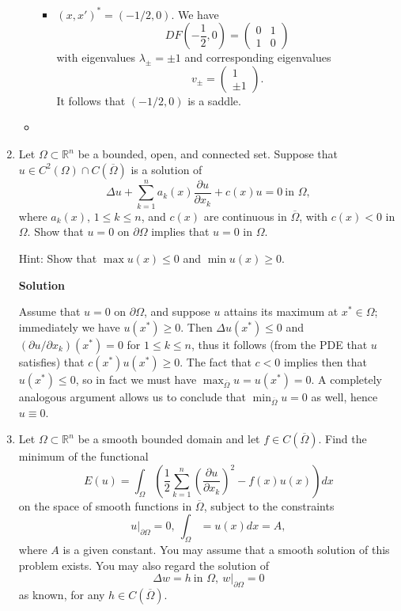 \documentclass{article}
\begin{document}
\begin{enumerate}
\begin{itemize}
\begin{itemize}
\item \((x,x')^* = (-1/2, 0)\).  We have
\[DF \left( -\frac{1}{2}, 0 \right) = \left( \begin{array}{cc} 0 & 1 \\ 1 & 0 \end{array} \right)\]
with eigenvalues \(\lambda_{\pm} = \pm 1\) and corresponding eigenvalues
\[v_{\pm} = \left( \begin{array}{c} 1 \\ \pm 1 \end{array} \right).\]
It follows that \((-1/2, 0)\) is a saddle.

\end{itemize}

\item

\end{itemize}



\item Let \(\Omega \subset \mathbb{R}^n\) be a bounded, open, and connected set.  Suppose that \(u \in C^2(\Omega) \cap C \left( \overline{\Omega} \right)\) is a solution of
\[\Delta u + \sum_{k = 1}^n a_k(x) \frac{\partial u}{\partial x_k} + c(x) u = 0 \ \text{in \(\Omega\)},\]
where \(a_k(x)\), \(1 \leq k \leq n\), and \(c(x)\) are continuous in \(\overline{\Omega}\), with \(c(x) < 0\) in \(\Omega\).  Show that \(u = 0\) on \(\partial\Omega\) implies that \(u = 0\) in \(\Omega\).

Hint:  Show that \(\max u(x) \leq 0\) and \(\min u(x) \geq 0\).

{\bf Solution}

Assume that \(u = 0\) on \(\partial\Omega\), and suppose \(u\) attains its maximum at \(x^* \in \Omega\); immediately we have \(u(x^*) \geq 0\).  Then \(\Delta u(x^*) \leq 0\) and \(\left( \partial u / \partial x_k \right)(x^*) = 0\) for \(1 \leq k \leq n\), thus it follows (from the PDE that \(u\) satisfies) that \(c(x^*) u(x^*) \geq 0\).  The fact that \(c < 0\) implies then that \(u(x^*) \leq 0\), so in fact we must have \(\max_{\overline{\Omega}} u = u(x^*) = 0\).  A completely analogous argument allows us to conclude that \(\min_{\overline{\Omega}} u = 0\) as well, hence \(u \equiv 0\).



\item Let \(\Omega \subset \mathbb{R}^n\) be a smooth bounded domain and let \(f \in C \left( \overline{\Omega} \right)\).  Find the minimum of the functional
\[E(u) = \int_{\Omega} \left( \frac{1}{2} \sum_{k = 1}^n \left( \frac{\partial u}{\partial x_k} \right)^2 - f(x) u(x) \right) dx\]
on the space of smooth functions in \(\overline{\Omega}\), subject to the constraints
\[u|_{\partial\Omega} = 0,  \ \int_{\Omega} = u(x) dx = A,\]
where \(A\) is a given constant.  You may assume that a smooth solution of this problem exists.  You may also regard the solution of
\[\Delta w = h \ \text{in \(\Omega\)}, \ w|_{\partial\Omega} = 0\]
as known, for any \(h \in C \left( \overline{\Omega} \right)\).


\end{enumerate}
\end{document}
